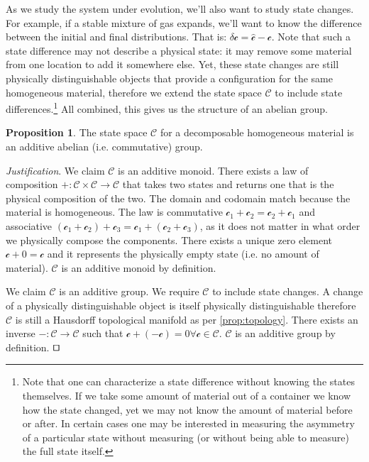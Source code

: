 \documentclass[smallextended]{svjour3}
\numberwithin{equation}{section}
\newenvironment{justification}{\emph{Justification}.}{\hfill\(\qed\)}
\theoremstyle{definition}
\newtheorem{prop}[equation]{Proposition}
\newenvironment{justification}{\emph{Justification}.}{\qed}
\begin{document}
As we study the system under evolution, we'll also want to study state changes. For example, if a stable mixture of gas expands, we'll want to know the difference between the initial and final distributions. That is: $\delta\mathcal{c}=\hat{\mathcal{c}}-\mathcal{c}$. Note that such a state difference may not describe a physical state: it may remove some material from one location to add it somewhere else. Yet, these state changes are still physically distinguishable objects that provide a configuration for the same homogeneous material, therefore we extend the state space $\mathcal{C}$ to include state differences.\footnote{Note that one can characterize a state difference without knowing the states themselves. If we take some amount of material out of a container we know how the state changed, yet we may not know the amount of material before or after. In certain cases one may be interested in measuring the asymmetry of a particular state without measuring (or without being able to measure) the full state itself.} All combined, this gives us the structure of an abelian group.

\begin{prop}\label{prop:abelian_group}
The state space $\mathcal{C}$ for a decomposable homogeneous material is an additive abelian (i.e. commutative) group.
\end{prop}

\begin{justification}
We claim $\mathcal{C}$ is an additive monoid. There exists a law of composition $+ : \mathcal{C} \times \mathcal{C} \rightarrow \mathcal{C}$ that takes two states and returns one that is the physical composition of the two. The domain and codomain match because the material is homogeneous. The law is commutative $\mathcal{c}_1 +\mathcal{c}_2 = \mathcal{c}_2+\mathcal{c}_1$ and associative $(\mathcal{c}_1 + \mathcal{c}_2) + \mathcal{c}_3 = \mathcal{c}_1 + (\mathcal{c}_2 + \mathcal{c}_3)$, as it does not matter in what order we physically compose the components. There exists a unique zero element $\mathcal{c} + 0 = \mathcal{c}$ and it represents the physically empty state (i.e. no amount of material). $\mathcal{C}$ is an additive monoid by definition.

We claim $\mathcal{C}$ is an additive group. We require $\mathcal{C}$ to include state changes. A change of a physically distinguishable object is itself physically distinguishable therefore $\mathcal{C}$ is still a Hausdorff topological manifold as per \ref{prop:topology}. There exists an inverse $- : \mathcal{C} \rightarrow \mathcal{C}$ such that $\mathcal{c} + ( - \mathcal{c}) = 0 \forall \mathcal{c} \in \mathcal{C}$. $\mathcal{C}$ is an additive group by definition. 
\end{justification}
\end{document}
